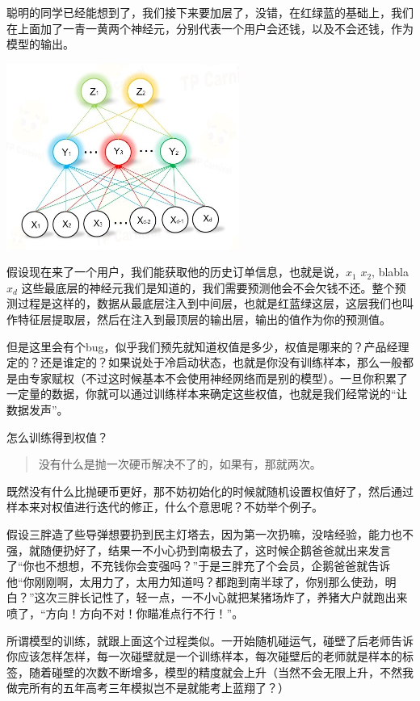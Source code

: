\documentclass{article}
\begin{document}
聪明的同学已经能想到了，我们接下来要加层了，没错，在红绿蓝的基础上，我们在上面加了一青一黄两个神经元，分别代表一个用户会还钱，以及不会还钱，作为模型的输出。


\begin{center}
\includegraphics[width=3in]{image/image10.jpg}
\end{center}


假设现在来了一个用户，我们能获取他的历史订单信息，也就是说，$x_1$ $x_2$, blabla $x_d$ 这些最底层的神经元我们是知道的，我们需要预测他会不会欠钱不还。整个预测过程是这样的，数据从最底层注入到中间层，也就是红蓝绿这层，这层我们也叫作特征层提取层，然后在注入到最顶层的输出层，输出的值作为你的预测值。


但是这里会有个bug，似乎我们预先就知道权值是多少，权值是哪来的？产品经理定的？还是谁定的？如果说处于冷启动状态，也就是你没有训练样本，那么一般都是由专家赋权（不过这时候基本不会使用神经网络而是别的模型）。一旦你积累了一定量的数据，你就可以通过训练样本来确定这些权值，也就是我们经常说的“让数据发声”。

怎么训练得到权值？

\begin{quote}
没有什么是抛一次硬币解决不了的，如果有，那就两次。

\end{quote}

既然没有什么比抛硬币更好，那不妨初始化的时候就随机设置权值好了，然后通过样本来对权值进行迭代的修正，什么个意思呢？不妨举个例子。

假设三胖造了些导弹想要扔到民主灯塔去，因为第一次扔嘛，没啥经验，能力也不强，就随便扔好了，结果一不小心扔到南极去了，这时候企鹅爸爸就出来发言了“你也不想想，不充钱你会变强吗？”于是三胖充了个会员，企鹅爸爸就告诉他“你刚刚啊，太用力了，太用力知道吗？都跑到南半球了，你别那么使劲，明白？”这次三胖长记性了，轻一点，一不小心就把某猪场炸了，养猪大户就跑出来喷了，“方向！方向不对！你瞄准点行不行！”。

所谓模型的训练，就跟上面这个过程类似。一开始随机碰运气，碰壁了后老师告诉你应该怎样怎样，每一次碰壁就是一个训练样本，每次碰壁后的老师就是样本的标签，随着碰壁的次数不断增多，模型的精度就会上升（当然不会无限上升，不然我做完所有的五年高考三年模拟岂不是就能考上蓝翔了？）
\end{document}
